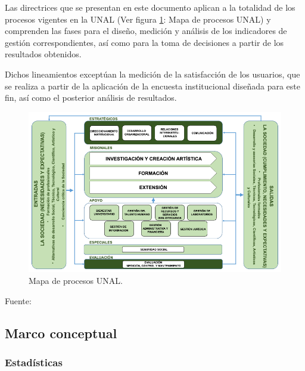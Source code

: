\documentclass[
]{book}
\begin{document}
Las directrices que se presentan en este documento aplican a la totalidad de los procesos vigentes en la UNAL
(Ver figura \ref{fig:figura1}: Mapa de procesos UNAL) y comprenden las fases para el diseño, medición y análisis de los indicadores de gestión correspondientes, así como para la toma de decisiones a partir de los resultados
obtenidos.

Dichos lineamientos exceptúan la medición de la satisfacción de los usuarios, que se realiza a partir de la aplicación de la encuesta institucional diseñada para este fin, así como el posterior análisis de resultados.

\begin{figure}

{\centering \includegraphics[width=1\linewidth]{Imagenes/figura_1} 

}

\caption{Mapa de procesos UNAL.}\label{fig:figura1}
\end{figure}

Fuente: \citet{Castro2021Jun}

\hypertarget{marco-conceptual}{%
\subsection{Marco conceptual}\label{marco-conceptual}}

\hypertarget{estaduxedsticas}{%
\subsubsection{Estadísticas}\label{estaduxedsticas}}
\end{document}
